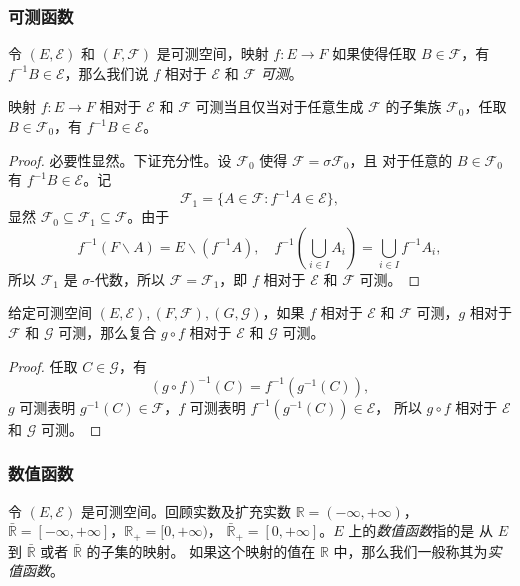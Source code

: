 \documentclass[fontset=none]{Notes}
\begin{document}
\subsubsection{可测函数}

令 $(E,\mathcal{E})$ 和 $(F,\mathcal{F})$ 是可测空间，映射 $f:E\to F$ 如果使得任取 $B\in \mathcal{F}$，有
$f^{-1}B\in \mathcal{E}$，那么我们说 $f$ 相对于 $\mathcal{E}$ 和 $\mathcal{F}$ \emph{可测}。

\begin{proposition}\label{prop:equivalent condition of measurable}
  映射 $f:E\to F$ 相对于 $\mathcal{E}$ 和 $\mathcal{F}$ 可测当且仅当对于任意生成 $\mathcal{F}$ 的子集族
  $\mathcal{F}_0$，任取 $B\in \mathcal{F}_0$，有 $f^{-1}B\in \mathcal{E}$。
\end{proposition}
\begin{proof}
  必要性显然。下证充分性。设 $\mathcal{F}_0$ 使得 $\mathcal{F}=\sigma \mathcal{F}_0$，且
  对于任意的 $B\in \mathcal{F}_0$ 有 $f^{-1}B\in \mathcal{E}$。记
  \[
    \mathcal{F}_1=\{A\in \mathcal{F}: f^{-1}A\in \mathcal{E}\},
  \]
  显然 $\mathcal{F}_0\subseteq \mathcal{F}_1\subseteq \mathcal{F}$。由于
  \[
    f^{-1}\left(F \smallsetminus A\right)=E \smallsetminus(f^{-1}A),\quad
    f^{-1}\left(\bigcup_{i\in I}A_i\right)=\bigcup_{i\in I} f^{-1}A_i,
  \]
  所以 $\mathcal{F}_1$ 是 $\sigma$-代数，所以 $\mathcal{F}=\mathcal{F}_1$，即 $f$ 
  相对于 $\mathcal{E}$ 和 $\mathcal{F}$ 可测。
\end{proof}

\begin{proposition}
  给定可测空间 $(E,\mathcal{E}),(F,\mathcal{F}),(G,\mathcal{G})$，如果 $f$ 相对于 $\mathcal{E}$ 和 
  $\mathcal{F}$ 可测，$g$ 相对于 $\mathcal{F}$ 和 $\mathcal{G}$ 可测，那么复合
  $g\circ f$ 相对于 $\mathcal{E}$ 和 $\mathcal{G}$ 可测。
\end{proposition}
\begin{proof}
  任取 $C\in \mathcal{G}$，有
  \[
    (g\circ f)^{-1}(C)=f^{-1}\left(g^{-1}(C)\right),  
  \]
  $g$ 可测表明 $g^{-1}(C)\in \mathcal{F}$，$f$ 可测表明 $f^{-1}\left(g^{-1}(C)\right)\in \mathcal{E}$，
  所以 $g\circ f$ 相对于 $\mathcal{E}$ 和 $\mathcal{G}$ 可测。
\end{proof}

\subsubsection{数值函数}

令 $(E,\mathcal{E})$ 是可测空间。回顾实数及扩充实数 $\mathbb{R}=(-\infty,+\infty)$，
$\bar{\mathbb{R}}=[-\infty,+\infty]$，$\mathbb{R}_+=[0,+\infty)$，
$\bar{\mathbb{R}}_+=[0,+\infty]$。$E$ 上的\emph{数值函数}指的是
从 $E$ 到 $\bar{\mathbb{R}}$ 或者 $\bar{\mathbb{R}}$ 的子集的映射。
如果这个映射的值在 $\mathbb{R}$ 中，那么我们一般称其为\emph{实值函数}。
\end{document}
